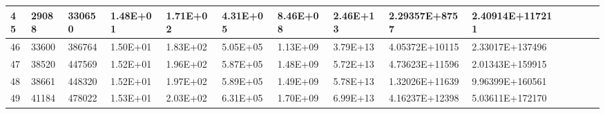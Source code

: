 \documentclass{article}
\begin{document}
\begin{itemize}
\begin{table}[H]
{\begin{tabular}{|l|l|l|l|l|l|l|l|l|l|l|l|l|l|}
    \hline
    45    & 29088 & 330650 & 1.48E+01 & 1.71E+02 & 4.31E+05 & 8.46E+08 & 2.46E+13 & 2.29357E+8757 & 2.40914E+117211 \\
    \hline
    46    & 33600 & 386764 & 1.50E+01 & 1.83E+02 & 5.05E+05 & 1.13E+09 & 3.79E+13 & 4.05372E+10115 & 2.33017E+137496 \\
    \hline
    47    & 38520 & 447569 & 1.52E+01 & 1.96E+02 & 5.87E+05 & 1.48E+09 & 5.72E+13 & 4.73623E+11596 & 2.01343E+159915 \\
    \hline
    48    & 38661 & 448320 & 1.52E+01 & 1.97E+02 & 5.89E+05 & 1.49E+09 & 5.78E+13 & 1.32026E+11639 & 9.96399E+160561 \\
    \hline
    49    & 41184 & 478022 & 1.53E+01 & 2.03E+02 & 6.31E+05 & 1.70E+09 & 6.99E+13 & 4.16237E+12398 & 5.03611E+172170 \\
\hline
\bottomrule
\end{tabular}}
\end{table}


\end{itemize}
\end{document}

